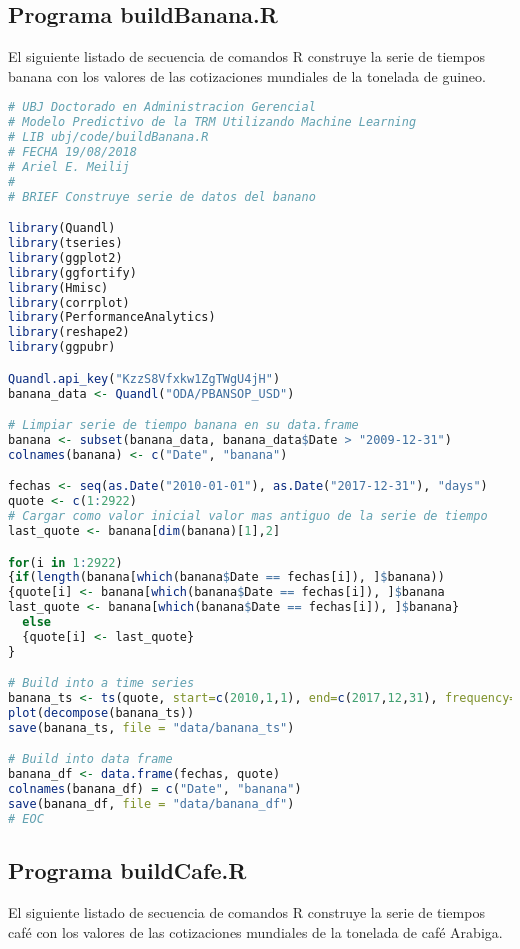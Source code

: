 \subsection{Programa buildBanana.R}
El siguiente listado de secuencia de comandos R construye la serie de tiempos banana con los valores de las cotizaciones mundiales de la tonelada de guineo.

\begin{lstlisting}[language=R]
# UBJ Doctorado en Administracion Gerencial
# Modelo Predictivo de la TRM Utilizando Machine Learning
# LIB ubj/code/buildBanana.R 
# FECHA 19/08/2018
# Ariel E. Meilij
#
# BRIEF Construye serie de datos del banano

library(Quandl)
library(tseries)
library(ggplot2)
library(ggfortify)
library(Hmisc)
library(corrplot)
library(PerformanceAnalytics)
library(reshape2)
library(ggpubr)

Quandl.api_key("KzzS8Vfxkw1ZgTWgU4jH")
banana_data <- Quandl("ODA/PBANSOP_USD")

# Limpiar serie de tiempo banana en su data.frame
banana <- subset(banana_data, banana_data$Date > "2009-12-31")
colnames(banana) <- c("Date", "banana")

fechas <- seq(as.Date("2010-01-01"), as.Date("2017-12-31"), "days")
quote <- c(1:2922)
# Cargar como valor inicial valor mas antiguo de la serie de tiempo
last_quote <- banana[dim(banana)[1],2]

for(i in 1:2922)
{if(length(banana[which(banana$Date == fechas[i]), ]$banana))
{quote[i] <- banana[which(banana$Date == fechas[i]), ]$banana
last_quote <- banana[which(banana$Date == fechas[i]), ]$banana}
  else
  {quote[i] <- last_quote}
}

# Build into a time series
banana_ts <- ts(quote, start=c(2010,1,1), end=c(2017,12,31), frequency=365)
plot(decompose(banana_ts))
save(banana_ts, file = "data/banana_ts")

# Build into data frame
banana_df <- data.frame(fechas, quote)
colnames(banana_df) = c("Date", "banana")
save(banana_df, file = "data/banana_df")
# EOC
\end{lstlisting}

\subsection{Programa buildCafe.R}
El siguiente listado de secuencia de comandos R construye la serie de tiempos café con los valores de las cotizaciones mundiales de la tonelada de café Arabiga.

